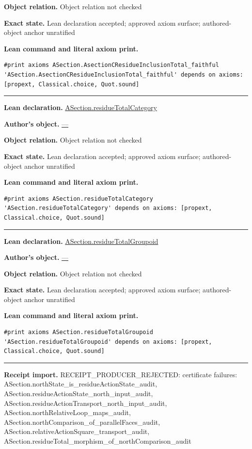 \documentclass[11pt]{article}
\theoremstyle{plain}
\theoremstyle{definition}
\theoremstyle{remark}
\begin{document}
\begin{tcolorbox}[provenancecard,title={45. Definition - The residue subdiagram and its inclusion},title after break={45. Definition - The residue subdiagram and its inclusion (continued)}]
\par\textbf{Object relation.} Object relation not checked
\par\textbf{Exact state.} Lean declaration accepted; approved axiom surface; authored-object anchor unratified
\par\smallskip\textbf{Lean command and literal axiom print.}
\begin{Verbatim}[breaklines=true,breakanywhere=true,fontsize=\small]
#print axioms ASection.AsectionCResidueInclusionTotal_faithful
'ASection.AsectionCResidueInclusionTotal_faithful' depends on axioms: [propext, Classical.choice, Quot.sound]
\end{Verbatim}
\medskip\hrule\medskip
\textbf{Lean declaration.} \url{ASection.residueTotalCategory}
\par\textbf{Author's object.} \url{—}
\par\textbf{Object relation.} Object relation not checked
\par\textbf{Exact state.} Lean declaration accepted; approved axiom surface; authored-object anchor unratified
\par\smallskip\textbf{Lean command and literal axiom print.}
\begin{Verbatim}[breaklines=true,breakanywhere=true,fontsize=\small]
#print axioms ASection.residueTotalCategory
'ASection.residueTotalCategory' depends on axioms: [propext, Classical.choice, Quot.sound]
\end{Verbatim}
\medskip\hrule\medskip
\textbf{Lean declaration.} \url{ASection.residueTotalGroupoid}
\par\textbf{Author's object.} \url{—}
\par\textbf{Object relation.} Object relation not checked
\par\textbf{Exact state.} Lean declaration accepted; approved axiom surface; authored-object anchor unratified
\par\smallskip\textbf{Lean command and literal axiom print.}
\begin{Verbatim}[breaklines=true,breakanywhere=true,fontsize=\small]
#print axioms ASection.residueTotalGroupoid
'ASection.residueTotalGroupoid' depends on axioms: [propext, Classical.choice, Quot.sound]
\end{Verbatim}
\medskip\hrule\medskip
\textbf{Receipt import.} \textcolor{KgtRed}{RECEIPT\_PRODUCER\_REJECTED: certificate failures: ASection.northState\_is\_residueActionState\_audit, ASection.residueActionState\_north\_input\_audit, ASection.residueActionTransport\_north\_input\_audit, ASection.northRelativeLoop\_maps\_audit, ASection.northComparison\_of\_parallelFaces\_audit, ASection.relativeActionSquare\_transport\_audit, ASection.residueTotal\_morphism\_of\_northComparison\_audit}
\end{tcolorbox}
\end{document}
